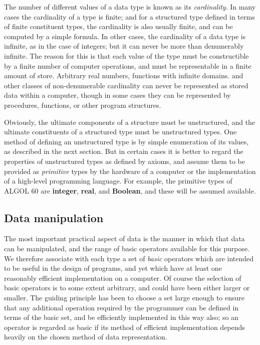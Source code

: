 \documentclass[twoside,11pt]{book}
\begin{document}
The number of different values of a data type is known as its \textit{cardinality}. In many cases the cardinality of a type is finite; and for a structured type defined in terms of finite constituent types, the cardinality is also usually finite, and can be computed by a simple formula. In other cases, the cardinality of a data type is infinite, as in the case of integers; but it can never be more than denumerably infinite. The reason for this is that each value of the type must be constructible by a finite number of computer operations, and must be representable in a finite amount of store. Arbitrary real numbers, functions with infinite domains. and other classes of non-denumerable cardinality can never be represented as stored data within a computer, though in some cases they can be represented by procedures, functions, or other program structures.

Obviously, the ultimate components of a structure must be unstructured, and the ultimate constituents of a structured type must be unstructured types. One method of defining an unstructured type is by simple enumeration of its values, as described in the next section. But in certain cases it is better to regard the properties of unstructured types as defined by axioms, and assume them to be provided as \textit{primitive} types by the hardware of a computer or the implementation of a high-level programming language. For example, the primitive types of ALGOL 60 are \textbf{integer}, \textbf{real}, and \textbf{Boolean}, and these will be assumed available.

\subsection{Data manipulation}

The most important practical aspect of data is the manner in which that data can be manipulated, and the range of basic operators available for this purpose. We therefore associate with each type a set of \textit{basic} operators which are intended to be useful in the design of programs, and yet which have at least one reasonably efficient implementation on a computer. Of course the selection of basic operators is to some extent arbitrary, and could have been either larger or smaller. The guiding principle has been to choose a set large enough to ensure that any additional operation required by the programmer can be defined in terms of the basic set, and be efficiently implemented in this way also; so an operator is regarded as basic if its method of efficient implementation depends heavily on the chosen method of data representation.
\end{document}
